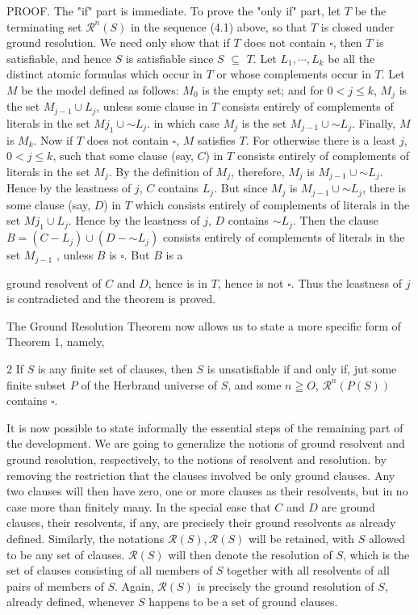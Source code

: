 \documentclass[8pt]{extarticle}
\begin{document}
PROOF. The "if" part is immediate. To prove the "only if" part, let $T$ be the
terminating set $\mathscr{R}^n(S)$ in the sequence (4.1) above, so that $T$ is closed under ground resolution. We need only show that if $T$ does not contain $\square$, then $T$ is satisfiable, and hence $S$ is satisfiable since $S$ $\subseteq$ $T$. Let $L_1, \dotsm , L_k$ be all the distinct atomic formulas which occur in $T$ or whose complements occur in $T$. Let $M$ be the model defined as follows: $M_0$ is the empty set; and for $0 < j \leq k$, $M_j$ is the set $M_{j-1} \cup {L_j}$, unless some clause in $T$ consists entirely of complements of literals in the set $M{j_1}\cup{\sim L_j}$. in which case $M_j$ is the set $M_{j-1}\cup{\sim L_j}$. Finally, $M$ is $M_k$. Now if $T$ does not contain $\square$, $M$ satisfies $T$. For otherwise there is a least $j$, $0 < j \leq k$, such that some clause (say, $C$) in $T$ consists entirely of complements of literals in the set $M_j$. By the definition of $M_j$, therefore, $M_j$ is $M_{j-1} \cup {\sim L_j}$. Hence by the leastness of $j$, $C$ contains $L_j$. But since $M_j$ is $M_{j-1}\cup {\sim L_j}$, there is some clause (say, $D$) in $T$ which consists entirely of complements of literals in the set $M{j_1}\cup {L_j}$. Hence by the leastness of $j$, $D$ contains $\sim L_j$. Then the clause $B = (C - {L_j}) \cup (D - {\sim L_j})$ consists entirely of complements of literals in the set $M_{j-1}$ , unless $B$ is $\square$. But $B$ is a

\newpage

ground resolvent of $C$ and $D$, hence is in $T$, hence is not $\square$. Thus the leastness of $j$ is contradicted and the theorem is proved.

The Ground Resolution Theorem now allows us to state a more specific form
of Theorem 1, namely,


\begin{p7theorem}{2}\label{two}
If $S$ is any finite set of clauses, then $S$ is unsatisfiable if and only
if, jut some finite subset $P$ of the Herbrand universe of $S$, and some $n \geqq O$, $\mathscr{R}^n(P(S))$ contains $\square$.
\end{p7theorem}

It is now possible to state informally the essential steps of the remaining part of the development. We are going to generalize the notions of ground resolvent and ground resolution, respectively, to the notions of resolvent and resolution. by removing the restriction that the clauses involved be only ground clauses. Any two clauses will then have zero, one or more clauses as their resolvents, but in no case more than finitely many. In the special ease that $C$ and $D$ are ground clauses, their resolvents, if any, are precisely their ground resolvents as already defined. Similarly, the notations $\mathscr{R}(S), \mathscr{R}(S)$ will be retained, with $S$ allowed to be any set of clauses. $\mathscr{R}(S)$ will then denote the resolution of $S$, which
is the set of clauses consisting of all members of $S$ together with all resolvents of all pairs of members of $S$. Again, $\mathscr{R}(S)$ is precisely the ground resolution of $S$, already defined, whenever $S$ happens to be a set of ground clauses. 
\end{document}
